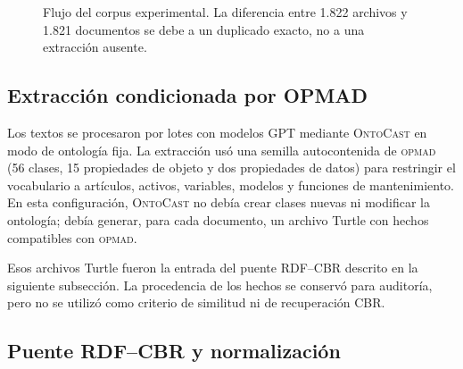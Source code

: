 \documentclass[11pt,a4paper]{article}
\newcommand{\OPMAD}{\textsc{opmad}}
\newcommand{\OntoCast}{\textsc{OntoCast}}
\newcommand{\RDF}{\textsc{rdf}}
\begin{document}
\begin{figure}[t]
\centering
{}
\caption{Flujo del corpus experimental. La diferencia entre 1.822 archivos y 1.821 documentos se debe a un duplicado exacto, no a una extracción ausente.}
\label{fig:flow-corpus}
\end{figure}

\subsection{Extracción condicionada por OPMAD}

Los textos se procesaron por lotes con modelos GPT mediante \OntoCast{} en modo de ontología fija. La extracción usó una semilla autocontenida de \OPMAD{} (56 clases, 15 propiedades de objeto y dos propiedades de datos) para restringir el vocabulario a artículos, activos, variables, modelos y funciones de mantenimiento. En esta configuración, \OntoCast{} no debía crear clases nuevas ni modificar la ontología; debía generar, para cada documento, un archivo Turtle con hechos compatibles con \OPMAD{}.

Esos archivos Turtle fueron la entrada del puente RDF--CBR descrito en la siguiente subsección. La procedencia de los hechos se conservó para auditoría, pero no se utilizó como criterio de similitud ni de recuperación CBR.

\subsection{Puente RDF--CBR y normalización}
\end{document}
